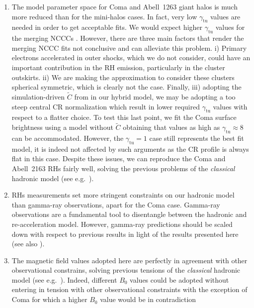 \documentclass[traditabstract]{aa}
\newcommand{\rmn}{\mathrm}
\begin{document}
\begin{enumerate} 
 \item The model parameter space for Coma and Abell~1263 giant halos is much more reduced than for the mini-halos cases. 
       In fact, very low $\gamma_{\rmn{tu}}$ values are needed in order to get acceptable fits.
       We would expect higher $\gamma_{\rmn{tu}}$ values for the merging NCCCs \citep{2011A&A...527A..99E}.
       However, there are three main factors that render the merging NCCC fits not conclusive and can alleviate this problem. 
       i) Primary electrons accelerated in outer shocks, which we do not consider, could have an important contribution in the RH emission, particularly in the cluster outskirts.
       ii) We are making the approximation to consider these clusters spherical symmetric, which is clearly not the case.
       Finally, iii) adopting the simulation-driven $\tilde{C}$ from \cite{2010MNRAS.409..449P} in our hybrid model, 
       we may be adopting a too steep central CR normalization which result in lower required $\gamma_{\rmn{tu}}$ values with respect to a 
       flatter choice. To test this last point, we fit the Coma surface brightness using a model without $\tilde{C}$ obtaining  
       that values as high as $\gamma_{\rmn{tu}} \approx 8$ can be accommodated. However, the $\gamma_{\rmn{tu}}=1$ case 
       still represents the best fit model, it is indeed not affected by such arguments as the CR profile is always flat in this case. 
       Despite these issues, we can reproduce the Coma and Abell~2163 RHs fairly well, solving the previous problems of 
       the \emph{classical} hadronic model (see e.g.~\citealp{2010MNRAS.401...47D}). 
 \item RHs measurements set more stringent constraints on our hadronic model than gamma-ray observations, apart for the Coma case.
       Gamma-ray observations are a fundamental tool to disentangle between the hadronic and re-acceleration model.
       However, gamma-ray predictions should be scaled down with respect to previous results \citep{2010MNRAS.409..449P,2011arXiv1105.3240P} 
       in light of the results presented here (see also \citealp{2011A&A...527A..99E}).
 \item The magnetic field values adopted here are perfectly in agreement with other observational constrains, solving previous tensions of the \emph{classical}
       hadronic model (see e.g.~\citealp{2011ApJ...728...53J}). Indeed, different $B_{0}$ values could be adopted without entering 
       in tension with other observational constraints with the exception of Coma for which a higher $B_{0}$ value would be in contradiction 

\end{enumerate}
\end{document}

